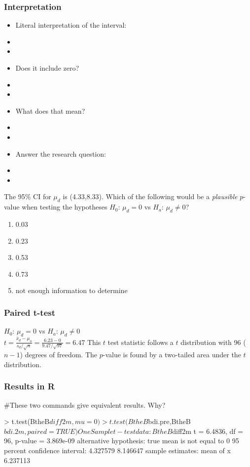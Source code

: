 \begin{frame}
\frametitle{Interpretation}
\begin{itemize}
    \item
    Literal interpretation of the interval:
    \item[]
    \item[]
    \item
    Does it include zero?
    \item[]
    \item[]
    \item
    What does that mean?
    \item[]
    \item[]
    \item
    Answer the research question:
    \item[]
    \item[]
\end{itemize}
\end{frame}

\begin{frame}
\begin{clicker}{The 95\% CI for $\mu_d$ is (4.33,8.33).  Which of the following would be a \emph{plausible} $p$-value when testing the hypotheses $H_0$: $\mu_d=0$ vs $H_a$: $\mu_d\neq 0$?}
\begin{enumerate}
    \item
    0.03
    \item
    0.23
    \item
    0.53
    \item
    0.73
    \item
    not enough information to determine
\end{enumerate}
\end{clicker}
\end{frame}



\begin{frame}
\frametitle{Paired t-test}
$H_0$: $\mu_d=0$ vs $H_a$: $\mu_d \neq 0$\\
\vskip20pt
$\displaystyle t=\frac{\bar{x}_d-\mu_0}{s_d/\sqrt{n}} =\frac{6.23-0}{9.47/\sqrt{97}}=6.47$
\vskip20pt
This $t$ test statistic follows a $t$ distribution with 96 ($n-1$) degrees of freedom.  The $p$-value is found by a two-tailed area under the $t$ distribution.
\end{frame}

\begin{frame}[fragile]
\frametitle{Results in R}
\begin{lcverbatim}
#These two commands give equivalent results.  Why?

> t.test(BtheB$diff2m,mu=0)

> t.test(BtheB$bdi.pre,BtheB$bdi.2m,paired=TRUE)


	One Sample t-test

data:  BtheB$diff2m
t = 6.4836, df = 96, p-value = 3.869e-09
alternative hypothesis: true mean is not equal to 0
95 percent confidence interval:
 4.327579 8.146647
sample estimates:
mean of x
 6.237113
\end{lcverbatim}
\end{frame}



